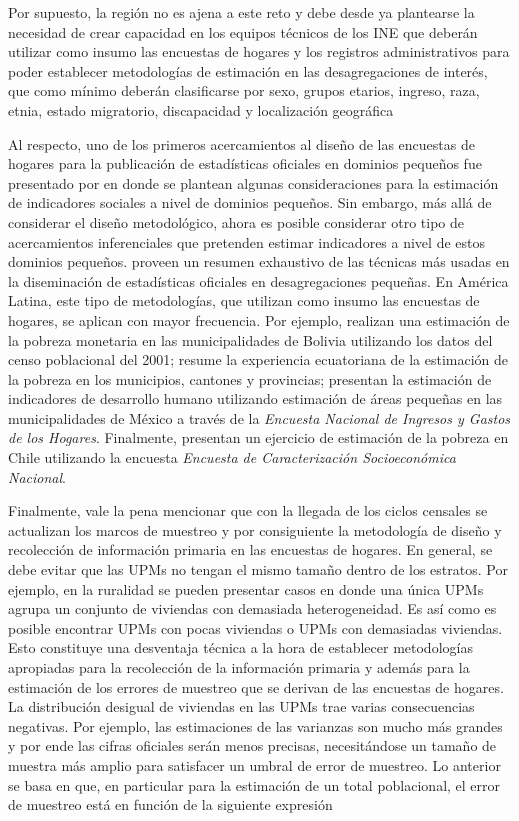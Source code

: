 \documentclass[
  10pt,
  spanish,
]{book}
\begin{document}
Por supuesto, la región no es ajena a este reto y debe desde ya plantearse la necesidad de crear capacidad en los equipos técnicos de los INE que deberán utilizar como insumo las encuestas de hogares y los registros administrativos para poder establecer metodologías de estimación en las desagregaciones de interés, que como mínimo deberán clasificarse por sexo, grupos etarios, ingreso, raza, etnia, estado migratorio, discapacidad y localización geográfica \citep{United_Nations_2016}

Al respecto, uno de los primeros acercamientos al diseño de las encuestas de hogares para la publicación de estadísticas oficiales en dominios pequeños fue presentado por \citet{Sinngh_Gambino_Mantel_1994} en donde se plantean algunas consideraciones para la estimación de indicadores sociales a nivel de dominios pequeños. Sin embargo, más allá de considerar el diseño metodológico, ahora es posible considerar otro tipo de acercamientos inferenciales que pretenden estimar indicadores a nivel de estos dominios pequeños. \citet{Rao_Molina_2014} proveen un resumen exhaustivo de las técnicas más usadas en la diseminación de estadísticas oficiales en desagregaciones pequeñas. En América Latina, este tipo de metodologías, que utilizan como insumo las encuestas de hogares, se aplican con mayor frecuencia. Por ejemplo, \citet{arias2007geography} realizan una estimación de la pobreza monetaria en las municipalidades de Bolivia utilizando los datos del censo poblacional del 2001; \citet{araujo20071990} resume la experiencia ecuatoriana de la estimación de la pobreza en los municipios, cantones y provincias; \citet{lopez2007poverty} presentan la estimación de indicadores de desarrollo humano utilizando estimación de áreas pequeñas en las municipalidades de México a través de la \emph{Encuesta Nacional de Ingresos y Gastos de los Hogares}. Finalmente, \citet{Casas_Cordero_Valencia_Encina_Lahiri_2016} presentan un ejercicio de estimación de la pobreza en Chile utilizando la encuesta \emph{Encuesta de Caracterización Socioeconómica Nacional}.

Finalmente, vale la pena mencionar que con la llegada de los ciclos censales se actualizan los marcos de muestreo y por consiguiente la metodología de diseño y recolección de información primaria en las encuestas de hogares. En general, se debe evitar que las UPMs no tengan el mismo tamaño dentro de los estratos. Por ejemplo, en la ruralidad se pueden presentar casos en donde una única UPMs agrupa un conjunto de viviendas con demasiada heterogeneidad. Es así como es posible encontrar UPMs con pocas viviendas o UPMs con demasiadas viviendas. Esto constituye una desventaja técnica a la hora de establecer metodologías apropiadas para la recolección de la información primaria y además para la estimación de los errores de muestreo que se derivan de las encuestas de hogares. La distribución desigual de viviendas en las UPMs trae varias consecuencias negativas. Por ejemplo, las estimaciones de las varianzas son mucho más grandes y por ende las cifras oficiales serán menos precisas, necesitándose un tamaño de muestra más amplio para satisfacer un umbral de error de muestreo. Lo anterior se basa en que, en particular para la estimación de un total poblacional, el error de muestreo está en función de la siguiente expresión
\end{document}
